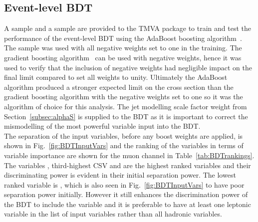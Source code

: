 \subsection{Event-level BDT}
A \ttbar sample and a \tttt sample are provided to the TMVA package to train and test the performance of the event-level BDT using the AdaBoost boosting algorithm~\cite{FREUND1997119}. The \MADGRAPH\aMCATNLO \tttt sample was used with all negative weights set to one in the training. The gradient boosting algorithm~\cite{mason1999boosting} can be used with negative weights, hence it was used to verify that the inclusion of negative weights had negligible impact on the final limit compared to set all weights to unity. Ultimately the AdaBoost algorithm produced a stronger expected limit on the \tttt cross section than the gradient boosting algorithm with the negative weights set to one so it was the algorithm of choice for this analysis. The jet modelling scale factor weight from Section~\ref{subsec:alphaS} is supplied to the BDT as it is important to correct the mismodelling of the most powerful variable input into the BDT.\\
The separation of the input variables, before any boost weights are applied, is shown in Fig.~\ref{fig:BDTInputVars} and the ranking of the variables in terms of variable importance are shown for the muon channel in Table~\ref{tab:BDTrankings}. The variables \njets, third-highest CSV and \htrat are the highest ranked variables and their discriminating power is evident in their initial separation power. The lowest ranked variable is \leadleppt, which is also seen in Fig.~\ref{fig:BDTInputVars} to have poor separation power initially. However it still enhances the discrimination power of the BDT to include the \leadleppt variable and it is preferable to have at least one leptonic variable in the list of input variables rather than all hadronic variables.

